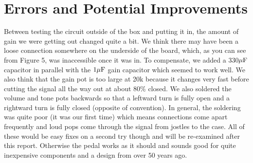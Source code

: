 \documentclass[%
reprint,
amsmath,amssymb,
aps,       
author-year 
]{revtex4-2}
\begin{document}
\section{Errors and Potential Improvements}

Between testing the circuit outside of the box and putting it in, the amount of gain we were getting out changed quite a bit. We think there may have been a loose connection somewhere on the underside of the board, which, as you can see from Figure 5, was inaccessible once it was in. To compensate, we added a 330$\rm \mu F$ capacitor in parallel with the $\rm 1\mu F$ gain capacitor which seemed to work well. We also think that the gain pot is too large at 20k because it changes very fast before cutting the signal all the way out at about 80\% closed. We also soldered the volume and tone pots backwards so that a leftward turn is fully open and a rightward turn is fully closed (opposite of convention). In general, the soldering was quite poor (it was our first time) which means connections come apart frequently and loud pops come through the signal from jostles to the case. All of these would be easy fixes on a second try though and will be re-examined after this report. Otherwise the pedal works as it should and sounds good for quite inexpensive components and a design from over 50 years ago.
\end{document}
